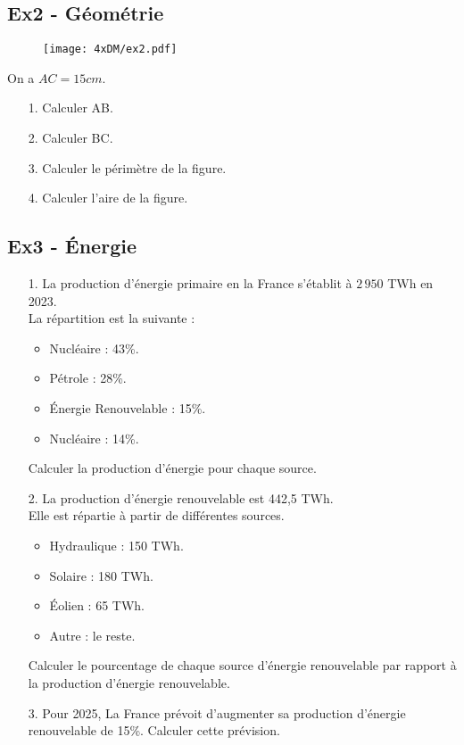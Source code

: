 \begin{multicols}{2}\noindent
\subsection*{Ex2 - Géométrie}

\begin{figure}[H]
  \centering
  \texttt{[image: 4xDM/ex2.pdf]}
\end{figure}

On a $AC = 15cm$.

\begin{enumerate}
  \item[1.] Calculer AB.
  \item[2.] Calculer BC.
  \item[3.] Calculer le périmètre de la figure.
  \item[4.] Calculer l'aire de la figure. 
\end{enumerate} \columnbreak


\subsection*{Ex3 - Énergie}

\begin{enumerate}
  \item[1.] La production d’énergie primaire en la France s’établit à $2 \, 950$ TWh en 2023. \\
  La répartition est la suivante : 

  \begin{itemize}[label={$\bullet$}]
    \item Nucléaire : 43\%. 
    \item Pétrole : 28\%. 
    \item Énergie Renouvelable : 15\%. 
    \item Nucléaire : 14\%.
  \end{itemize} 
  Calculer la production d'énergie pour chaque source. 

  \item[2.] La production d'énergie renouvelable est 442,5 TWh. \\
  Elle est répartie à partir de différentes sources.

  \begin{itemize}[label={$\bullet$}]
    \item Hydraulique : 150 TWh. 
    \item Solaire : 180 TWh. 
    \item Éolien : 65 TWh.
    \item Autre : le reste. 
  \end{itemize} 

  Calculer le pourcentage de chaque source d'énergie renouvelable par rapport à la production d'énergie renouvelable.

  \item[3.] Pour 2025, La France prévoit d'augmenter sa production d'énergie renouvelable de 15\%. Calculer cette prévision. 
\end{enumerate}

\end{multicols}


